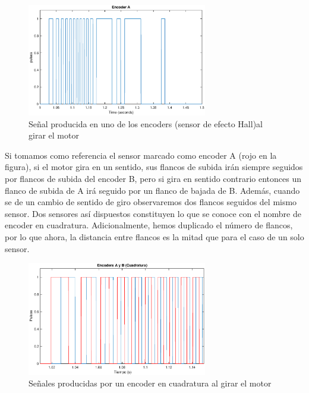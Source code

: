 \documentclass[10pt,a4paper]{report}
\begin{document}
\begin{figure}
\centering
\includegraphics[width= 0.7\textwidth]{encodera.eps}
\caption{Señal producida en uno de los encoders (sensor de efecto Hall)al girar el motor }\label{f5}
\end{figure} 
Si tomamos como referencia el sensor marcado como encoder A (rojo en la figura), si el motor gira en un sentido, sus flancos de subida irán siempre seguidos por flancos de subida del encoder B, pero si gira  en sentido contrario entonces un flanco de subida de A irá seguido por un flanco de bajada de B. Además, cuando se de un cambio de sentido de giro observaremos dos flancos seguidos del mismo sensor. Dos sensores así dispuestos constituyen lo que se conoce con el nombre de encoder en cuadratura. Adicionalmente, hemos duplicado el número de flancos, por lo que ahora, la distancia entre flancos  es la mitad que para el caso de un solo sensor.
\begin{figure}
\centering
\includegraphics[width= 0.7\textwidth]{encoderab.eps}
\caption{Señales producidas por un encoder en cuadratura al girar el motor }\label{f6}
\end{figure} 
\end{document}
